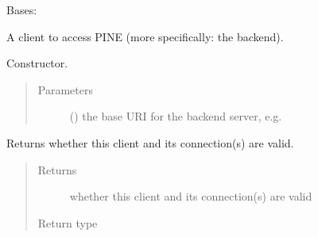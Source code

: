 \documentclass[letterpaper,10pt,english]{sphinxmanual}
\begin{document}
\begin{fulllineitems}
\label{\detokenize{autoapi/pine/client/index:pine.client.PineClient}}
Bases: {\hyperref[\detokenize{autoapi/pine/client/client/index:pine.client.client.BaseClient}]{}}

A client to access PINE (more specifically: the backend).

Constructor.
\begin{quote}\begin{description}
\item[{Parameters}] \leavevmode
{} () \textendash{} the base URI for the backend server, e.g. 

\end{description}\end{quote}

\begin{fulllineitems}
\label{\detokenize{autoapi/pine/client/index:pine.client.PineClient.is_valid}}
Returns whether this client and its connection(s) are valid.
\begin{quote}\begin{description}
\item[{Returns}] \leavevmode
whether this client and its connection(s) are valid

\item[{Return type}] \leavevmode
{}

\end{description}\end{quote}

\end{fulllineitems}



\end{fulllineitems}
\end{document}
